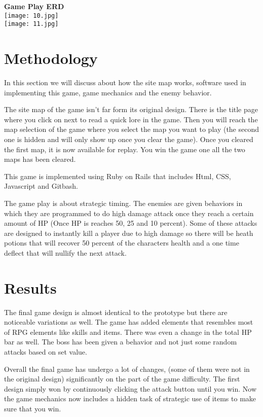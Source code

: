 \documentclass{acm_proc_article-sp}
\begin{document}
\textbf{Game Play ERD}\\
\texttt{[image: 10.jpg]}\\
\texttt{[image: 11.jpg]}\\


\section{Methodology}
In this section we will discuss about how the site map works, software used in implementing this game, game mechanics and the enemy behavior. 

The site map of the game isn't far form its original design. There is the title page where you click on next to read a quick lore in the game. Then you will reach the map selection of the game where you select the map you want to play (the second one is hidden and will only show up once you clear the game). Once you cleared the first map, it is now available for replay. You win the game one all the two maps has been cleared. 

This game is implemented using Ruby on Rails that includes Html, CSS, Javascript and Gitbash.

The game play is about strategic timing. The enemies are given behaviors in which they are programmed to do high damage attack once they reach a certain amount of HP (Once HP is reaches 50, 25 and 10 percent). Some of these attacks are designed to instantly kill a player due to high damage so there will be heath potions that will recover 50 percent of the characters health and a one time deflect that will nullify the next attack.   

\section{Results}
The final game design is almost identical to the prototype but there are noticeable variations as well. The game has added elements that resembles most of RPG elements like skills and items. There was even a change in the total HP bar as well. The boss has been given a behavior and not just some random attacks based on set value.

Overall the final game has undergo a lot of changes, (some of them were not in the original design) significantly on the part of the game difficulty. The first design simply won by continuously clicking the attack button until you win. Now the game mechanics now includes a hidden task of strategic use of items to make sure that you win.  
\end{document}
